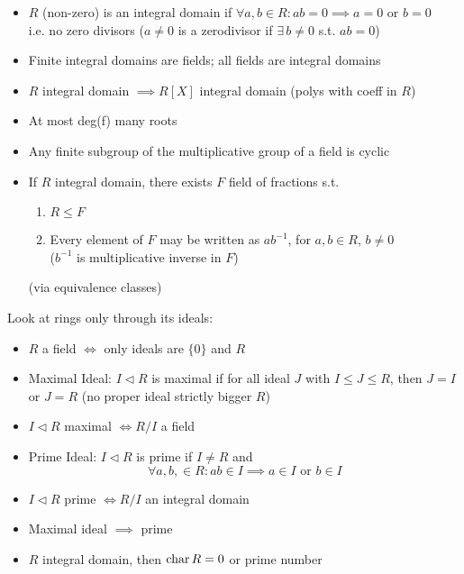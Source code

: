 \begin{itemize}
      \item $R$ (non-zero) is an integral domain if $\forall a,b \in R: ab=0 \implies a=0 \text{ or } b =0$ \\
            i.e. no zero divisors ($a \neq 0$ is a zerodivisor if $\exists \, b \neq 0$ s.t. $ab=0$)
      \item Finite integral domains are fields; all fields are integral domains
      \item $R$ integral domain $\implies R[X]$ integral domain (polys with coeff in $R$)
      \item At most deg(f) many roots
      \item Any finite subgroup of the multiplicative group of a field is cyclic
      \item If $R$ integral domain, there exists $F$ field of fractions s.t. \begin{enumerate}
                  \item $R \leq F$
                  \item Every element of $F$ may be written as $ab^{-1}$, for $a,b \in R$, $b \neq 0$ \\
                        ($b^{-1}$ is multiplicative inverse in $F$)
            \end{enumerate} (via equivalence classes)
\end{itemize}

Look at rings only through its ideals:

\begin{itemize}
      \item $R$ a field $\iff$ only ideals are $\{0\}$ and $R$
      \item Maximal Ideal: $I \triangleleft R$ is maximal if for all ideal $J$ with $I \leq J \leq R$, then $J = I$ or $J=R$
            (no proper ideal strictly bigger $R$)
      \item $I \triangleleft R$ maximal $\iff R/I$ a field
      \item Prime Ideal: $I \triangleleft R$ is prime if $I \neq R$ and \[\forall a,b, \in R: ab \in I \implies a\in I \text{ or } b \in I\]
      \item $I \triangleleft R$ prime $\iff R/I$ an integral domain
      \item Maximal ideal $\implies$ prime
      \item $R$ integral domain, then $\operatorname{char} R = 0$ or prime number
\end{itemize}

